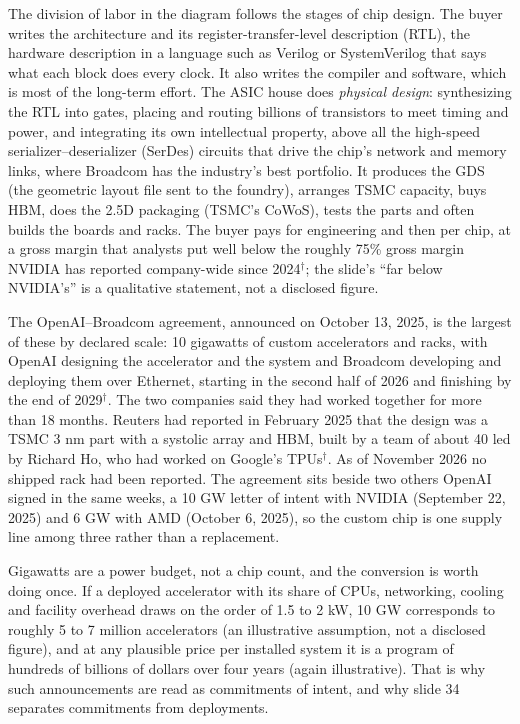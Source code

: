 \documentclass[11pt,letterpaper]{article}
\begin{document}
The division of labor in the diagram follows the stages of chip design. The buyer writes the architecture and its register-transfer-level description (RTL), the hardware description in a language such as Verilog or SystemVerilog that says what each block does every clock. It also writes the compiler and software, which is most of the long-term effort. The ASIC house does \emph{physical design}: synthesizing the RTL into gates, placing and routing billions of transistors to meet timing and power, and integrating its own intellectual property, above all the high-speed serializer--deserializer (SerDes) circuits that drive the chip's network and memory links, where Broadcom has the industry's best portfolio. It produces the GDS (the geometric layout file sent to the foundry), arranges TSMC capacity, buys HBM, does the 2.5D packaging (TSMC's CoWoS), tests the parts and often builds the boards and racks. The buyer pays for engineering and then per chip, at a gross margin that analysts put well below the roughly 75\% gross margin NVIDIA has reported company-wide since 2024$^\dagger$; the slide's ``far below NVIDIA's'' is a qualitative statement, not a disclosed figure.

The OpenAI--Broadcom agreement, announced on October 13, 2025, is the largest of these by declared scale: 10 gigawatts of custom accelerators and racks, with OpenAI designing the accelerator and the system and Broadcom developing and deploying them over Ethernet, starting in the second half of 2026 and finishing by the end of 2029$^\dagger$. The two companies said they had worked together for more than 18 months. Reuters had reported in February 2025 that the design was a TSMC 3 nm part with a systolic array and HBM, built by a team of about 40 led by Richard Ho, who had worked on Google's TPUs$^\dagger$. As of November 2026 no shipped rack had been reported. The agreement sits beside two others OpenAI signed in the same weeks, a 10 GW letter of intent with NVIDIA (September 22, 2025) and 6 GW with AMD (October 6, 2025), so the custom chip is one supply line among three rather than a replacement.

Gigawatts are a power budget, not a chip count, and the conversion is worth doing once. If a deployed accelerator with its share of CPUs, networking, cooling and facility overhead draws on the order of 1.5 to 2 kW, 10 GW corresponds to roughly 5 to 7 million accelerators (an illustrative assumption, not a disclosed figure), and at any plausible price per installed system it is a program of hundreds of billions of dollars over four years (again illustrative). That is why such announcements are read as commitments of intent, and why slide 34 separates commitments from deployments.
\end{document}
